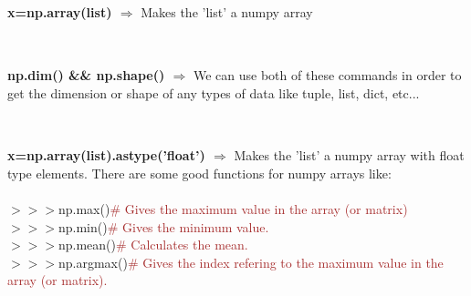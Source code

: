 \documentclass[a4paper,18pt]{article}
\begin{document}

\subsection{\colorbox {matgreen}{\color{white}{\large np.array(list)}}}
\textbf{x=np.array(list) $\Rightarrow$} Makes the 'list' a numpy array\\\\


\subsection{\colorbox {matgreen}{\color{white}{\large Dimension and Shape}}}
\textbf{np.dim() \&\& np.shape() $\Rightarrow$} We can use both of these commands in order to get the dimension or shape of any types of data like tuple, list, dict, etc...\\\\


\subsection{\colorbox {matgreen}{\color{white}{\large np.array(list).astype('float')}}}
\textbf{x=np.array(list).astype('float') $\Rightarrow$} Makes the 'list' a numpy array with float type elements. There are some good functions for numpy arrays like:\\\\

$>>>$np.max(){\textcolor{brown}{\# Gives the maximum value in the array (or matrix)}}\\

$>>>$np.min(){\textcolor{brown}{\# Gives the minimum value.}}\\

$>>>$np.mean(){\textcolor{brown}{\# Calculates the mean.}}\\

$>>>$np.argmax(){\textcolor{brown}{\# Gives the index refering to the maximum value in the array (or matrix).}}\\\\
\end{document}
